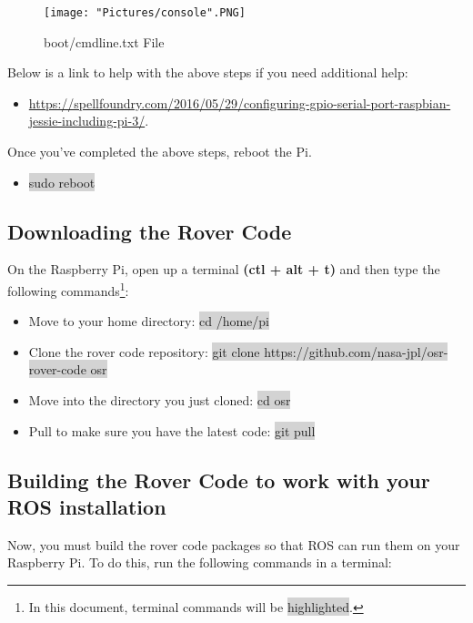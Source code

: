 \documentclass{article}
\begin{document}
\begin{figure}[H]
 	\centering
	\texttt{[image: "Pictures/console".PNG]}
 	\caption{boot/cmdline.txt File}
	\label{console}
\end{figure}

\noindent Below is a link to help with the above steps if you need additional help:
\begin{itemize}
	\item \href{https://spellfoundry.com/2016/05/29/configuring-gpio-serial-port-raspbian-jessie-including-pi-3/}{https://spellfoundry.com/2016/05/29/configuring-gpio-serial-port-raspbian-jessie-including-pi-3/}. 
\end{itemize}
\noindent Once you've completed the above steps, reboot the Pi.
\begin{itemize}
	\item[] \colorbox{lightgray}{sudo reboot}
\end{itemize}

\subsection{Downloading the Rover Code}
On the Raspberry Pi, open up a terminal \textbf{(ctl + alt + t)} and then type the following commands\footnote{In this document, terminal commands will be \colorbox{lightgray}{highlighted}.}:

\begin{itemize}
	\item[] Move to your home directory: \colorbox{lightgray}{cd /home/pi}
	\item[] Clone the rover code repository: \colorbox{lightgray}{git clone https://github.com/nasa-jpl/osr-rover-code osr}
	\item[] Move into the directory you just cloned: \colorbox{lightgray}{cd osr}
	\item[] Pull to make sure you have the latest code: \colorbox{lightgray}{git pull}
\end{itemize}

\subsection{Building the Rover Code to work with your ROS installation}
Now, you must build the rover code packages so that ROS can run them on your Raspberry Pi.  To do this, run the following commands in a terminal:
\end{document}
